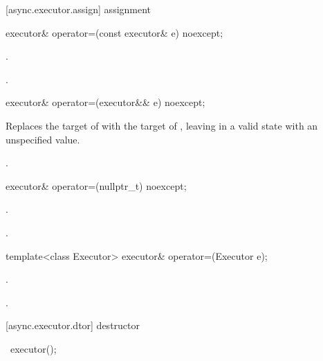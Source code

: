 [async.executor.assign]{ assignment}

%
\begin{itemdecl}
executor& operator=(const executor& e) noexcept;
\end{itemdecl}

\begin{itemdescr}
\pnum
\effects {}.

\pnum
\returns {}.
\end{itemdescr}

%
\begin{itemdecl}
executor& operator=(executor&& e) noexcept;
\end{itemdecl}

\begin{itemdescr}
\pnum
\effects Replaces the target of  with the target of , leaving  in a valid state with an unspecified value.

\pnum
\returns {}.
\end{itemdescr}

%
\begin{itemdecl}
executor& operator=(nullptr_t) noexcept;
\end{itemdecl}

\begin{itemdescr}
\pnum
\effects {}.

\pnum
\returns {}.
\end{itemdescr}

%
\begin{itemdecl}
template<class Executor> executor& operator=(Executor e);
\end{itemdecl}

\begin{itemdescr}
\pnum
\effects {}.

\pnum
\returns {}.
\end{itemdescr}



[async.executor.dtor]{ destructor}

%
\begin{itemdecl}
~executor();
\end{itemdecl}

